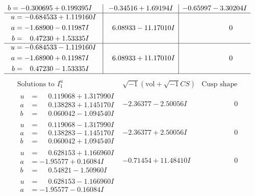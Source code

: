 \documentclass[1p]{elsarticle_modified}
\theoremstyle{definition}
\newcommand{\I}{\sqrt{-1}}
\begin{document}
$$\begin{array}{c|c|c}
\begin{aligned}
b &= -0.300695 + 0.199395 I\end{aligned}
 & -0.34516 + 1.69194 I & -0.65997 - 3.30204 I \\ \hline\begin{aligned}
u &= -0.684533 + 1.119160 I \\
a &= -1.68900 - 0.11987 I \\
b &= \phantom{-}0.47230 + 1.53335 I\end{aligned}
 & \phantom{-}6.08933 - 11.17010 I & \phantom{-0.000000 } 0 \\ \hline\begin{aligned}
u &= -0.684533 - 1.119160 I \\
a &= -1.68900 + 0.11987 I \\
b &= \phantom{-}0.47230 - 1.53335 I\end{aligned}
 & \phantom{-}6.08933 + 11.17010 I & \phantom{-0.000000 } 0\\
 \hline 
 \end{array}$$\newpage$$\begin{array}{c|c|c}  
\text{Solutions to }I^u_{1}& \I (\text{vol} + \sqrt{-1}CS) & \text{Cusp shape}\\
 \hline 
\begin{aligned}
u &= \phantom{-}0.119068 + 1.317990 I \\
a &= \phantom{-}0.138283 + 1.145170 I \\
b &= \phantom{-}0.060042 - 1.094540 I\end{aligned}
 & -2.36377 - 2.50056 I & \phantom{-0.000000 } 0 \\ \hline\begin{aligned}
u &= \phantom{-}0.119068 - 1.317990 I \\
a &= \phantom{-}0.138283 - 1.145170 I \\
b &= \phantom{-}0.060042 + 1.094540 I\end{aligned}
 & -2.36377 + 2.50056 I & \phantom{-0.000000 } 0 \\ \hline\begin{aligned}
u &= \phantom{-}0.628153 + 1.166960 I \\
a &= -1.95577 + 0.16084 I \\
b &= \phantom{-}0.54821 - 1.50960 I\end{aligned}
 & -0.71454 + 11.48410 I & \phantom{-0.000000 } 0 \\ \hline\begin{aligned}
u &= \phantom{-}0.628153 - 1.166960 I \\
a &= -1.95577 - 0.16084 I \\

\end{aligned}
\end{array}$$
\end{document}
